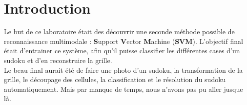 
\chapter{Introduction} %

\label{Chapitre 1} %


Le but de ce laboratoire était des découvrir une seconde méthode possible de reconnaissance multimodale : \textbf{S}upport \textbf{V}ector \textbf{M}achine (\textbf{SVM}). L'objectif final était d'entrainer ce système, afin qu'il puisse classifier les différentes cases d'un sudoku et d'en reconstruire la grille.\\

Le beau final aurait été de faire une photo d'un sudoku, la transformation de la grille, le découpage des cellules, la classification et le résolution du sudoku automatiquement. Mais par manque de temps, nous n'avons pas pu aller jusque là.

























